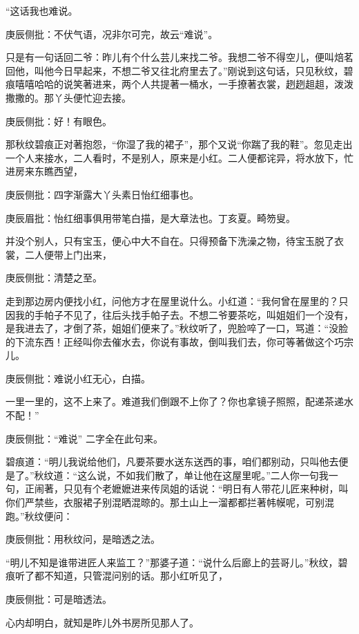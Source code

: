 \begin{parag}
    “这话我也难说。\begin{note}庚辰侧批：不伏气语，况非尔可完，故云“难说”。\end{note}只是有一句话回二爷：昨儿有个什么芸儿来找二爷。我想二爷不得空儿，便叫焙茗回他，叫他今日早起来，不想二爷又往北府里去了。”刚说到这句话，只见秋纹，碧痕嘻嘻哈哈的说笑著进来，两个人共提著一桶水，一手撩著衣裳，趔趔趄趄，泼泼撒撒的。那丫头便忙迎去接。\begin{note}庚辰侧批：好！有眼色。\end{note}那秋纹碧痕正对著抱怨，“你湿了我的裙子”，那个又说“你踹了我的鞋”。忽见走出一个人来接水，二人看时，不是别人，原来是小红。二人便都诧异，将水放下，忙进房来东瞧西望，\begin{note}庚辰侧批：四字渐露大丫头素日怡红细事也。\end{note}\begin{note}庚辰眉批：怡红细事俱用带笔白描，是大章法也。丁亥夏。畸笏叟。\end{note}并没个别人，只有宝玉，便心中大不自在。只得预备下洗澡之物，待宝玉脱了衣裳，二人便带上门出来，\begin{note}庚辰侧批：清楚之至。\end{note}
\end{parag}


\begin{parag}
    走到那边房内便找小红，问他方才在屋里说什么。小红道：“我何曾在屋里的？只因我的手帕子不见了，往后头找手帕子去。不想二爷要茶吃，叫姐姐们一个没有，是我进去了，才倒了茶，姐姐们便来了。”秋纹听了，兜脸啐了一口，骂道：“没脸的下流东西！正经叫你去催水去，你说有事故，倒叫我们去，你可等著做这个巧宗儿。\begin{note}庚辰侧批：难说小红无心，白描。\end{note}一里一里的，这不上来了。难道我们倒跟不上你了？你也拿镜子照照，配递茶递水不配！”\begin{note}庚辰侧批：“难说” 二字全在此句来。\end{note}碧痕道：“明儿我说给他们，凡要茶要水送东送西的事，咱们都别动，只叫他去便是了。”秋纹道：“这么说，不如我们散了，单让他在这屋里呢。”二人你一句我一句，正闹著，只见有个老嬷嬷进来传凤姐的话说：“明日有人带花儿匠来种树，叫你们严禁些，衣服裙子别混晒混晾的。那土山上一溜都都拦著帏幙呢，可别混跑。”秋纹便问：\begin{note}庚辰侧批：用秋纹问，是暗透之法。\end{note}“明儿不知是谁带进匠人来监工？”那婆子道：“说什么后廊上的芸哥儿。”秋纹，碧痕听了都不知道，只管混问别的话。那小红听见了，\begin{note}庚辰侧批：可是暗透法。\end{note}心内却明白，就知是昨儿外书房所见那人了。
\end{parag}


